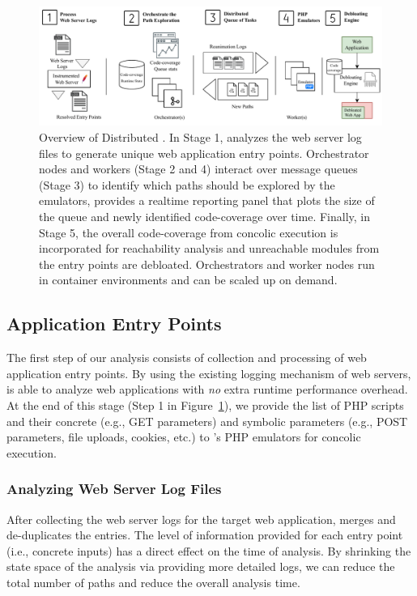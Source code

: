 \begin{figure}[t]
    \centering
    \includegraphics[width=\textwidth]{figures/ad/animatedead_diagram.pdf}
    \caption{Overview of Distributed \animatedead{}. In Stage 1, \animatedead{} analyzes the web server log files to generate unique web application entry points. Orchestrator nodes and workers (Stage 2 and 4) interact over message queues (Stage 3) to identify which paths should be explored by the emulators, \animatedead{} provides a realtime reporting panel that plots the size of the queue and newly identified code-coverage over time. Finally, in Stage 5, the overall code-coverage from concolic execution is incorporated for reachability analysis and unreachable modules from the entry points are debloated. Orchestrators and worker nodes run in container environments and can be scaled up on demand.}
    \label{fig:ad_diagram}
    \vspace{-1em}
\end{figure}

\subsection{Application Entry Points}
The first step of our analysis consists of collection and processing of web application entry points.  
By using the existing logging mechanism of web servers, \animatedead{} is able to analyze web applications with \emph{no} extra runtime performance overhead. 
At the end of this stage (Step 1 in Figure~\ref{fig:ad_diagram}), we provide the list of PHP scripts and their concrete (e.g., GET parameters) and symbolic parameters (e.g., POST parameters, file uploads, cookies, etc.) to \animatedead{}'s PHP emulators for concolic execution. 

\subsubsection*{Analyzing Web Server Log Files} 
After collecting the web server logs for the target web application, \animatedead{} merges and de-duplicates the entries. 
The level of information provided for each entry point (i.e., concrete inputs) has a direct effect on the time of analysis. 
By shrinking the state space of the analysis via providing more detailed logs, we can reduce the total number of paths and reduce the overall analysis time. 

